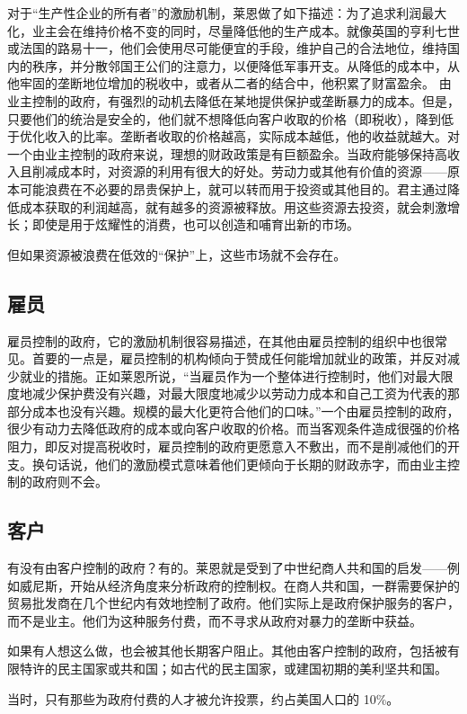 对于“生产性企业的所有者”的激励机制，莱恩做了如下描述：为了追求利润最大化，业主会在维持价格不变的同时，尽量降低他的生产成本。就像英国的亨利七世或法国的路易十一，他们会使用尽可能便宜的手段，维护自己的合法地位，维持国内的秩序，并分散邻国王公们的注意力，以便降低军事开支。从降低的成本中，从他牢固的垄断地位增加的税收中，或者从二者的结合中，他积累了财富盈余。 由业主控制的政府，有强烈的动机去降低在某地提供保护或垄断暴力的成本。但是，只要他们的统治是安全的，他们就不想降低向客户收取的价格（即税收），降到低于优化收入的比率。垄断者收取的价格越高，实际成本越低，他的收益就越大。对一个由业主控制的政府来说，理想的财政政策是有巨额盈余。当政府能够保持高收入且削减成本时，对资源的利用有很大的好处。劳动力或其他有价值的资源——原本可能浪费在不必要的昂贵保护上，就可以转而用于投资或其他目的。君主通过降低成本获取的利润越高，就有越多的资源被释放。用这些资源去投资，就会刺激增长；即使是用于炫耀性的消费，也可以创造和哺育出新的市场。

但如果资源被浪费在低效的“保护”上，这些市场就不会存在。

\subsection{雇员}
雇员控制的政府，它的激励机制很容易描述，在其他由雇员控制的组织中也很常见。首要的一点是，雇员控制的机构倾向于赞成任何能增加就业的政策，并反对减少就业的措施。正如莱恩所说，“当雇员作为一个整体进行控制时，他们对最大限度地减少保护费没有兴趣，对最大限度地减少以劳动力成本和自己工资为代表的那部分成本也没有兴趣。规模的最大化更符合他们的口味。”一个由雇员控制的政府，很少有动力去降低政府的成本或向客户收取的价格。而当客观条件造成很强的价格阻力，即反对提高税收时，雇员控制的政府更愿意入不敷出，而不是削减他们的开支。换句话说，他们的激励模式意味着他们更倾向于长期的财政赤字，而由业主控制的政府则不会。

\subsection{客户}
有没有由客户控制的政府？有的。莱恩就是受到了中世纪商人共和国的启发——例如威尼斯，开始从经济角度来分析政府的控制权。在商人共和国，一群需要保护的贸易批发商在几个世纪内有效地控制了政府。他们实际上是政府保护服务的客户，而不是业主。他们为这种服务付费，而不寻求从政府对暴力的垄断中获益。

如果有人想这么做，也会被其他长期客户阻止。其他由客户控制的政府，包括被有限特许的民主国家或共和国；如古代的民主国家，或建国初期的美利坚共和国。

当时，只有那些为政府付费的人才被允许投票，约占美国人口的 10\%。

